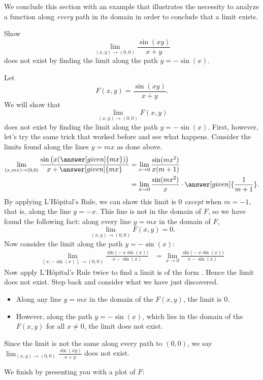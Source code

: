 \documentclass{ximera}
\newcommand{\point}[1]{\left(#1\right)} %
\begin{document}
We conclude this section with an example that illustrates the necessity to analyze a function along \emph{every} path in its domain in order to conclude that a limit exists.

\begin{example} 
  Show
  \[
  \lim_{\point{x,y}\to\point{0,0}} \frac{\sin(xy)}{x+y}
  \]
  does not exist by finding the limit along the path $y=-\sin(x)$.
  \begin{explanation}
    Let
    \[
    F\point{x,y} = \frac{\sin(xy)}{x+y}.
    \]
    We will show that
    \[
    \lim_{\point{x,y}\to\point{0,0}} F\point{x,y}
    \]
    does not exist by finding the limit along the path
    $y=-\sin(x)$. First, however, let's try the same trick that worked
    before and see what happens. Consider the limits found along the
    lines $y=mx$ as done above.
    \begin{align*}
      \lim_{\point{x,mx}\to\point{0,0}} \frac{\sin\big(x(\answer[given]{mx})\big)}{x+\answer[given]{mx}} &= \lim_{x\to 0} \frac{\sin (mx^2)}{x(m+1)} \\
      &= \lim_{x\to 0} \frac{\sin(mx^2)}{x}\cdot\answer[given]{\frac{1}{m+1}}.
    \end{align*}
    By applying L'H\^opital's Rule, we can show this limit is $0$
    \emph{except} when $m=-1$, that is, along the line $y=-x$. This
    line is not in the domain of $F$, so we have found the following
    fact: along every line $y=mx$ in the domain of $F$,
    \[
    \lim_{\point{x,y}\to\point{0,0}} F\point{x,y}=0.
    \]
    Now consider the limit along the path $y=-\sin(x)$:
    \begin{align*}
      \lim_{\point{x,-\sin(x)}\to\point{0,0}} \frac{\sin\big(-x\sin(x)\big)}{x-\sin(x)} &= \lim_{x\to0} \frac{\sin\big(-x\sin(x)\big)}{x-\sin(x)}
    \end{align*}
    Now apply L'H\^opital's Rule twice to find a limit is of the form
    \numOverZero.  Hence the limit does not exist.  Step back and
    consider what we have just discovered.
    \begin{itemize}
    \item Along any line $y=mx$ in the domain of the $F\point{x,y}$, the
      limit is $0$.
    \item However, along the path $y=-\sin(x)$, which lies in the
      domain of the $F\point{x,y}$ for all $x\neq 0$, the limit does not
      exist.
    \end{itemize}
    Since the limit is not the same along every path to $(0,0)$, we say
    $\lim_{\point{x,y}\to\point{0,0}}\frac{\sin(xy)}{x+y}$ does not exist.
    \begin{onlineOnly}
      We finish by presenting you with a plot of $F$:
      \begin{center}
      \end{center}
    \end{onlineOnly}
  \end{explanation}
\end{example}
\end{document}

